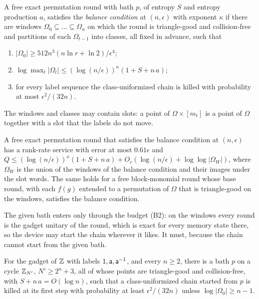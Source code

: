 \begin{definition}\label{def:balance}
A free exact permutation round with bath $p$, of entropy $S$ and entropy production $a$, satisfies the \emph{balance condition} at $(n,\epsilon)$ with
exponent $\kappa$ if there are windows $\Omega_0\subseteq\dots\subseteq\Omega_n$ on which the round is triangle-good and collision-free and partitions of each
$\Omega_{t-1}$ into classes, all fixed in advance, such that
\begin{enumerate}[label=(B\arabic*),itemsep=1pt]
\item $|\Omega_0|\ge512n^3(n\ln r+\ln2)/\epsilon^4$;
\item $\log\max_t|\Omega_t|\le(\log(n/\epsilon))^\kappa(1+S+n\,a)$;
\item for every label sequence the class-uniformized chain is killed with probability at most $\epsilon^2/(32n)$.
\end{enumerate}
\end{definition}

The windows and classes may contain slots: a point of $\Omega\times[m_t]$ is a point of $\Omega$ together with a slot that the labels do not move.

\begin{corollary}\label{cor:balance}
A free exact permutation round that satisfies the balance condition at $(n,\epsilon)$ has a rank-rate service with error at most $0.61\epsilon$ and
$Q\le(\log(n/\epsilon))^\kappa(1+S+n\,a)+O_r(\log(n/\epsilon)+\log\log|\Omega_W|)$, where $\Omega_W$ is the union of the windows of the balance
condition and their images under the slot words. The same holds for a free block-monomial round whose base round, with each $f(g)$
extended to a permutation of $\Omega$ that is triangle-good on the windows, satisfies the balance condition.
\end{corollary}

The given bath enters only through the budget (B2): on the windows every round is the gadget unitary of the round, which is exact for every memory
state there, so the device may start the chain wherever it likes. It must, because the chain cannot start from the given bath.

\begin{proposition}\label{prop:start}
For the gadget of $\mathbb Z$ with labels $1,\mathsf a,\mathsf a^{-1}$, and every $n\ge2$, there is a bath $p$ on a cycle $\mathbb Z_{N'}$, $N'\ge2^n+3$, all of whose points are
triangle-good and collision-free, with $S+n\,a=O(\log n)$, such that a class-uniformized chain started from $p$ is killed at its first step with
probability at least $\epsilon^2/(32n)$ unless $\log|\Omega_0|\ge n-1$.
\end{proposition}

